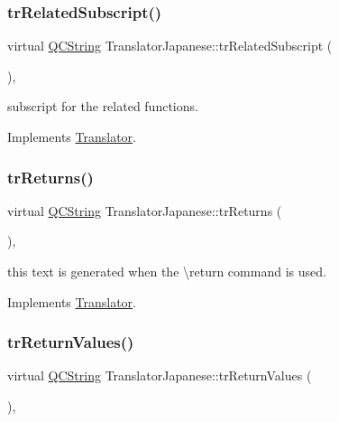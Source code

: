 \subsubsection{\texorpdfstring{trRelatedSubscript()}{trRelatedSubscript()}}
{\footnotesize\ttfamily virtual \mbox{\hyperlink{class_q_c_string}{Q\+C\+String}} Translator\+Japanese\+::tr\+Related\+Subscript (\begin{DoxyParamCaption}{ }\end{DoxyParamCaption})\hspace{0.3cm}{\ttfamily [inline]}, {\ttfamily [virtual]}}

subscript for the related functions. 

Implements \mbox{\hyperlink{class_translator}{Translator}}.

\mbox{\label{class_translator_japanese_a9f333b1119ef3fc289221613e126f3d9}} 
\subsubsection{\texorpdfstring{trReturns()}{trReturns()}}
{\footnotesize\ttfamily virtual \mbox{\hyperlink{class_q_c_string}{Q\+C\+String}} Translator\+Japanese\+::tr\+Returns (\begin{DoxyParamCaption}{ }\end{DoxyParamCaption})\hspace{0.3cm}{\ttfamily [inline]}, {\ttfamily [virtual]}}

this text is generated when the \textbackslash{}return command is used. 

Implements \mbox{\hyperlink{class_translator}{Translator}}.

\mbox{\label{class_translator_japanese_a5bedf06a919affd25020b0fdddc82cdf}} 
\subsubsection{\texorpdfstring{trReturnValues()}{trReturnValues()}}
{\footnotesize\ttfamily virtual \mbox{\hyperlink{class_q_c_string}{Q\+C\+String}} Translator\+Japanese\+::tr\+Return\+Values (\begin{DoxyParamCaption}{ }\end{DoxyParamCaption})\hspace{0.3cm}{\ttfamily [inline]}, {\ttfamily [virtual]}}

